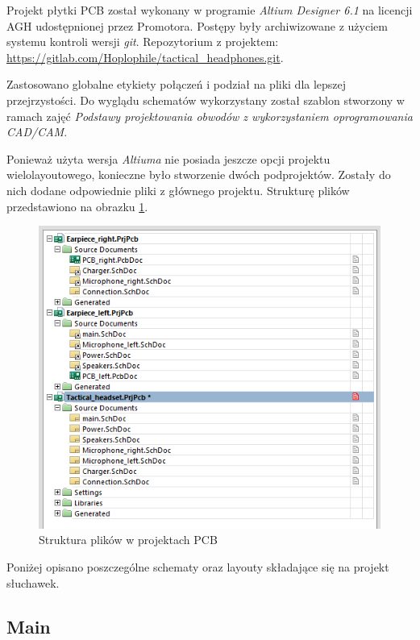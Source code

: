 Projekt płytki PCB został wykonany w programie \textit{Altium Designer 6.1} na licencji AGH udostępnionej przez Promotora. Postępy były archiwizowane z użyciem systemu kontroli wersji \textit{git}. Repozytorium z projektem: \url{https://gitlab.com/Hoplophile/tactical_headphones.git}.

Zastosowano globalne etykiety połączeń i podział na pliki dla lepszej przejrzystości. Do wyglądu schematów wykorzystany został szablon stworzony w ramach zajęć \textit{Podstawy projektowania obwodów z wykorzystaniem oprogramowania CAD/CAM}. 

Ponieważ użyta wersja \textit{Altiuma} nie posiada jeszcze opcji projektu wielolayoutowego, konieczne było stworzenie dwóch podprojektów. Zostały do nich dodane odpowiednie pliki z głównego projektu. Strukturę plików przedstawiono na obrazku \ref{pic:struktura}.

\begin{figure}[H]
	\centering
	\includegraphics[scale=0.6]{zdjecia/PCB/struktura.png}
	\caption{\label{pic:struktura} Struktura plików w projektach PCB}
\end{figure}

Poniżej opisano poszczególne schematy oraz layouty składające się na projekt słuchawek.


\subsection{Main}

